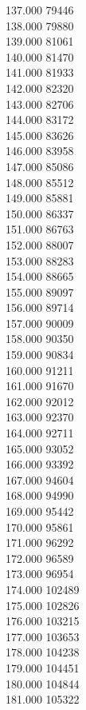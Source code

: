 { 137.000	79446 \\
 138.000	79880 \\
 139.000	81061 \\
 140.000	81470 \\
 141.000	81933 \\
 142.000	82320 \\
 143.000	82706 \\
 144.000	83172 \\
 145.000	83626 \\
 146.000	83958 \\
 147.000	85086 \\
 148.000	85512 \\
 149.000	85881 \\
 150.000	86337 \\
 151.000	86763 \\
 152.000	88007 \\
 153.000	88283 \\
 154.000	88665 \\
 155.000	89097 \\
 156.000	89714 \\
 157.000	90009 \\
 158.000	90350 \\
 159.000	90834 \\
 160.000	91211 \\
 161.000	91670 \\
 162.000	92012 \\
 163.000	92370 \\
 164.000	92711 \\
 165.000	93052 \\
 166.000	93392 \\
 167.000	94604 \\
 168.000	94990 \\
 169.000	95442 \\
 170.000	95861 \\
 171.000	96292 \\
 172.000	96589 \\
 173.000	96954 \\
 174.000	102489 \\
 175.000	102826 \\
 176.000	103215 \\
 177.000	103653 \\
 178.000	104238 \\
 179.000	104451 \\
 180.000	104844 \\
 181.000	105322 \\
}
